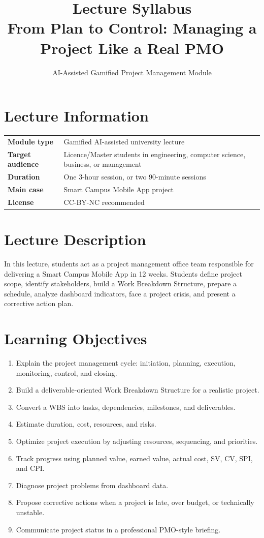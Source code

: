 \documentclass[11pt,a4paper]{article}
\title{\textbf{Lecture Syllabus}\\From Plan to Control: Managing a Project Like a Real PMO}
\author{AI-Assisted Gamified Project Management Module}
\date{}
\begin{document}
\maketitle

\section*{Lecture Information}

\begin{tabular}{>{\bfseries}p{4cm}p{10.5cm}}
Module type & Gamified AI-assisted university lecture \\
Target audience & Licence/Master students in engineering, computer science, business, or management \\
Duration & One 3-hour session, or two 90-minute sessions \\
Main case & Smart Campus Mobile App project \\
License & CC-BY-NC recommended \\
\end{tabular}

\section*{Lecture Description}

In this lecture, students act as a project management office team responsible for delivering a Smart Campus Mobile App in 12 weeks. Students define project scope, identify stakeholders, build a Work Breakdown Structure, prepare a schedule, analyze dashboard indicators, face a project crisis, and present a corrective action plan.

\section*{Learning Objectives}

\begin{enumerate}
  \item Explain the project management cycle: initiation, planning, execution, monitoring, control, and closing.
  \item Build a deliverable-oriented Work Breakdown Structure for a realistic project.
  \item Convert a WBS into tasks, dependencies, milestones, and deliverables.
  \item Estimate duration, cost, resources, and risks.
  \item Optimize project execution by adjusting resources, sequencing, and priorities.
  \item Track progress using planned value, earned value, actual cost, SV, CV, SPI, and CPI.
  \item Diagnose project problems from dashboard data.
  \item Propose corrective actions when a project is late, over budget, or technically unstable.
  \item Communicate project status in a professional PMO-style briefing.
\end{enumerate}
\end{document}
